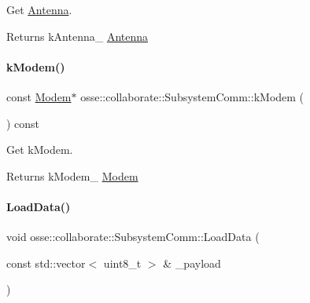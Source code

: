 Get \hyperlink{classosse_1_1collaborate_1_1_antenna}{Antenna}. 

\begin{DoxyReturn}{Returns}
k\+Antenna\+\_\+ \hyperlink{classosse_1_1collaborate_1_1_antenna}{Antenna} 
\end{DoxyReturn}
\mbox{\label{classosse_1_1collaborate_1_1_subsystem_comm_a8c5aa0a02bc95da7ad3cbd6063d0ed61}} 
\paragraph{\texorpdfstring{k\+Modem()}{kModem()}}
{\footnotesize\ttfamily const \hyperlink{classosse_1_1collaborate_1_1_modem}{Modem}$\ast$ osse\+::collaborate\+::\+Subsystem\+Comm\+::k\+Modem (\begin{DoxyParamCaption}{ }\end{DoxyParamCaption}) const\hspace{0.3cm}{\ttfamily [inline]}}



Get k\+Modem. 

\begin{DoxyReturn}{Returns}
k\+Modem\+\_\+ \hyperlink{classosse_1_1collaborate_1_1_modem}{Modem} 
\end{DoxyReturn}
\mbox{\label{classosse_1_1collaborate_1_1_subsystem_comm_a5177011bf7857dcb5d202ab460d2fc54}} 
\paragraph{\texorpdfstring{Load\+Data()}{LoadData()}}
{\footnotesize\ttfamily void osse\+::collaborate\+::\+Subsystem\+Comm\+::\+Load\+Data (\begin{DoxyParamCaption}\item[{const std\+::vector$<$ uint8\+\_\+t $>$ \&}]{\+\_\+payload }\end{DoxyParamCaption})}



